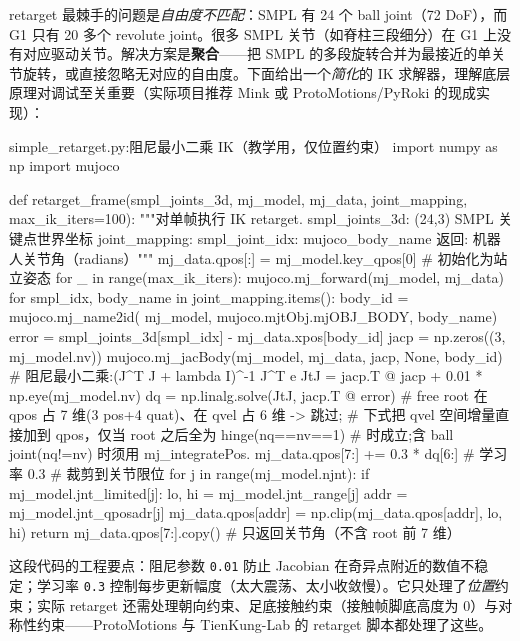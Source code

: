 retarget 最棘手的问题是\emph{自由度不匹配}：SMPL 有 24 个 ball joint（72 DoF），而 G1 只有 20 多个 revolute joint。很多 SMPL 关节（如脊柱三段细分）在 G1 上没有对应驱动关节。解决方案是\textbf{聚合}——把 SMPL 的多段旋转合并为最接近的单关节旋转，或直接忽略无对应的自由度。下面给出一个\emph{简化}的 IK 求解器，理解底层原理对调试至关重要（实际项目推荐 Mink 或 ProtoMotions/PyRoki 的现成实现）：

\begin{codebox}[Python]{simple\_retarget.py:阻尼最小二乘 IK（教学用，仅位置约束）}
import numpy as np
import mujoco

def retarget_frame(smpl_joints_3d, mj_model, mj_data,
                   joint_mapping, max_ik_iters=100):
    """对单帧执行 IK retarget.
    smpl_joints_3d: (24,3) SMPL 关键点世界坐标
    joint_mapping:  {smpl_joint_idx: mujoco_body_name}
    返回: 机器人关节角（radians）"""
    mj_data.qpos[:] = mj_model.key_qpos[0]          # 初始化为站立姿态
    for _ in range(max_ik_iters):
        mujoco.mj_forward(mj_model, mj_data)
        for smpl_idx, body_name in joint_mapping.items():
            body_id = mujoco.mj_name2id(
                mj_model, mujoco.mjtObj.mjOBJ_BODY, body_name)
            error = smpl_joints_3d[smpl_idx] - mj_data.xpos[body_id]
            jacp = np.zeros((3, mj_model.nv))
            mujoco.mj_jacBody(mj_model, mj_data, jacp, None, body_id)
            # 阻尼最小二乘:(J^T J + lambda I)^-1 J^T e
            JtJ = jacp.T @ jacp + 0.01 * np.eye(mj_model.nv)
            dq = np.linalg.solve(JtJ, jacp.T @ error)
            # free root 在 qpos 占 7 维(3 pos+4 quat)、在 qvel 占 6 维 -> 跳过;
            # 下式把 qvel 空间增量直接加到 qpos，仅当 root 之后全为 hinge(nq==nv==1)
            # 时成立;含 ball joint(nq!=nv) 时须用 mj_integratePos.
            mj_data.qpos[7:] += 0.3 * dq[6:]        # 学习率 0.3
        # 裁剪到关节限位
        for j in range(mj_model.njnt):
            if mj_model.jnt_limited[j]:
                lo, hi = mj_model.jnt_range[j]
                addr = mj_model.jnt_qposadr[j]
                mj_data.qpos[addr] = np.clip(mj_data.qpos[addr], lo, hi)
    return mj_data.qpos[7:].copy()                  # 只返回关节角（不含 root 前 7 维）
\end{codebox}

这段代码的工程要点：阻尼参数 \texttt{0.01} 防止 Jacobian 在奇异点附近的数值不稳定；学习率 \texttt{0.3} 控制每步更新幅度（太大震荡、太小收敛慢）。它只处理了\emph{位置}约束；实际 retarget 还需处理朝向约束、足底接触约束（接触帧脚底高度为 0）与对称性约束——ProtoMotions 与 TienKung-Lab 的 retarget 脚本都处理了这些。

